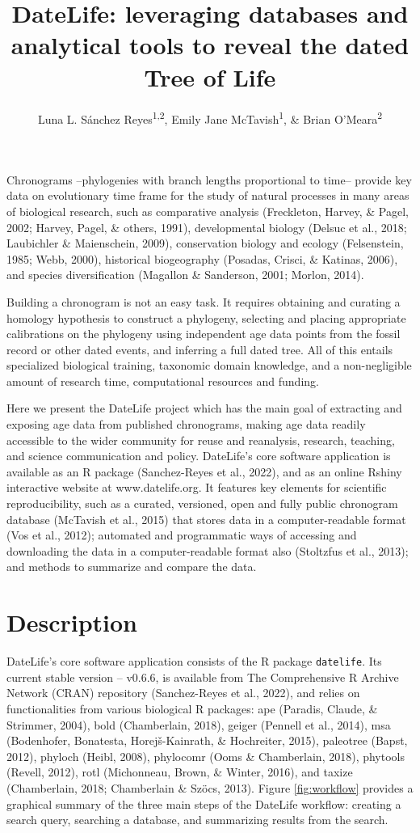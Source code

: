 \documentclass[english,man]{apa6}
\title{DateLife: leveraging databases and analytical tools to reveal the dated Tree of Life}
\author{Luna L. Sánchez Reyes\textsuperscript{1,2}, Emily Jane McTavish\textsuperscript{1}, \& Brian O'Meara\textsuperscript{2}}
\date{}
\affiliation{\vspace{0.5cm}\textsuperscript{1} University of California, Merced, USA\\\textsuperscript{2} University of Tennessee, Knoxville, USA}
\begin{document}
\maketitle

Chronograms --phylogenies with branch lengths proportional to time-- provide key data on evolutionary time frame for the study of natural processes in many areas of biological research, such as comparative analysis (Freckleton, Harvey, \& Pagel, 2002; Harvey, Pagel, \& others, 1991), developmental biology (Delsuc et al., 2018; Laubichler \& Maienschein, 2009), conservation biology and ecology (Felsenstein, 1985; Webb, 2000), historical biogeography (Posadas, Crisci, \& Katinas, 2006), and species diversification (Magallon \& Sanderson, 2001; Morlon, 2014).

Building a chronogram is not an easy task.
It requires obtaining and curating a homology hypothesis to construct a phylogeny, selecting and placing appropriate calibrations on the phylogeny using independent age data points from the fossil record or other dated events, and inferring a full dated tree. All of this entails specialized biological training, taxonomic domain knowledge, and a non-negligible amount of research time, computational resources and funding.

Here we present the DateLife project which has the main goal of extracting and exposing age data from published chronograms, making age data readily accessible to the wider community for reuse and reanalysis, research, teaching, and science communication and policy.
DateLife's core software application is available as an R package (Sanchez-Reyes et al., 2022), and as an online Rshiny interactive website at www.datelife.org. It features key elements for scientific reproducibility, such as a curated, versioned, open and fully public chronogram database (McTavish et al., 2015) that stores data in a computer-readable format (Vos et al., 2012); automated and programmatic ways of accessing and downloading the data in a computer-readable format also (Stoltzfus et al., 2013); and methods to summarize and compare the data.

\hypertarget{description}{%
\section{Description}\label{description}}

DateLife's core software application consists of the R package \texttt{datelife}. Its current stable version -- v0.6.6, is available from The Comprehensive R Archive Network (CRAN) repository (Sanchez-Reyes et al., 2022), and relies on functionalities from various biological R packages:
ape (Paradis, Claude, \& Strimmer, 2004),
bold (Chamberlain, 2018),
geiger (Pennell et al., 2014),
msa (Bodenhofer, Bonatesta, Horejš-Kainrath, \& Hochreiter, 2015),
paleotree (Bapst, 2012),
phyloch (Heibl, 2008),
phylocomr (Ooms \& Chamberlain, 2018),
phytools (Revell, 2012),
rotl (Michonneau, Brown, \& Winter, 2016), and
taxize (Chamberlain, 2018; Chamberlain \& Szöcs, 2013).
Figure \ref{fig:workflow} provides a graphical summary of the three main steps of the DateLife workflow: creating a search query, searching a database, and summarizing results from the search.
\end{document}
